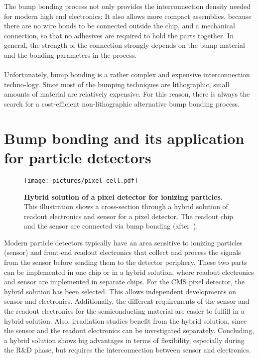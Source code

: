 The bump bonding process not only provides the interconnection density needed for modern high end electronics: It also allows more compact assemblies, because there are no wire bonds to be connected outside the chip, and a mechanical connection, so that no adhesives are required to hold the parts together. In general, the strength of the connection strongly depends on the bump material and the bonding parameters in the process.\\
\\Unfortunately, bump bonding is a rather complex and expensive interconnection techno-logy. Since most of the bumping techniques are lithographic, small amounts of material are relatively expensive. For this reason, there is always the search for a cost-efficient non-lithographic alternative bump bonding process.

\section{Bump bonding and its application for particle detectors}\label{sec:bump_bonding_pixel_detectors}
\begin{figure}
\begin{center}
\texttt{[image: pictures/pixel\_cell.pdf]}
\end{center}
\caption[Hybrid solution of a pixel detector for ionizing particles.]{\textbf{Hybrid solution of a pixel detector for ionizing particles.} This illustration shows a cross-section through a hybrid solution of readout electronics and sensor for a pixel detector. The readout chip and the sensor are connected via bump bonding (after~\cite{Ros06}).}\label{fig:pixel_cell}
\end{figure}
Modern particle detectors typically have an area sensitive to ionizing particles (sensor) and front-end readout electronics that collect and process the signals from the sensor before sending them to the detector periphery. These two parts can be implemented in one chip or in a hybrid solution, where readout electronics and sensor are implemented in separate chips. For the \ac{CMS} pixel detector, the hybrid solution has been selected. This allows independent developments on sensor and electronics. Additionally, the different requirements of the sensor and the readout electronics for the semiconducting material are easier to fulfill in a hybrid solution. Also, irradiation studies benefit from the hybrid solution, since the sensor and the readout electronics can be investigated separately. Concluding, a hybrid solution shows big advantages in terms of flexibility, especially during the R$\&$D phase, but requires the interconnection between sensor and electronics.

